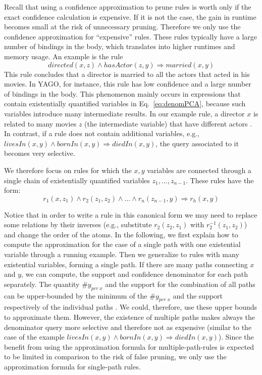 Recall that using a confidence approximation to prune rules is worth only if the exact confidence calculation is expensive. 
If it is not the case, the gain in runtime becomes small at the risk of unnecessary pruning.
Therefore we only use the confidence approximation for ``expensive'' rules. 
These rules typically have a large number of bindings in the body, which translates into 
higher runtimes and memory usage. An example is the rule 
\[
 directed(x,z) \wedge hasActor(z,y) \Rightarrow married(x,y)
\]
This rule concludes that a director is married to all the actors that acted in his movies. In YAGO, for instance,
this rule has low confidence and a large number of bindings in the body.
This phenomenon mainly occurs in expressions that contain existentially quantified variables in Eq.~\ref{eq:denomPCA}, 
because such variables introduce many intermediate results. In our example
rule, a director $x$ is related to many movies $z$ (the intermediate variable) that have different actors . 
In contrast, if a rule does not contain additional variables, 
e.g., $livesIn(x,y)\wedge bornIn(x,y)\Rightarrow diedIn(x,y)$, the query associated to it becomes very selective.

We therefore focus on rules for which the $x,y$ variables are connected through a single 
chain of existentially quantified variables $z_1,..., z_{n-1}$. These rules have the form:
$$
  r_1(x,z_1) \wedge r_2(z_1,z_2) \wedge ... \wedge r_n(z_{n-1},y) \Rightarrow r_h(x,y)
$$

Notice that in order to write a rule in this canonical form we may need to replace some relations by their inverses
(e.g., substitute $r_2(z_2,z_1)$ with $r_2^{-1}(z_1,z_2)$)
and change the order of the atoms.
In the following, we first explain how to compute the approximation for the case of a single 
path with one existential variable through a running example.
Then we generalize to rules with many existential variables, forming a single path. 
If there are many paths connecting $x$ and $y$, we can compute, the support and confidence denominator for each path separately.
The quantity $\#y_{per\;x}$ and the support for the combination of all paths can be upper-bounded by the minimum of the $\#y_{per\;x}$ and the support 
respectively of the individual paths . We could, therefore, use these upper bounds to approximate them.
However, the existence of multiple paths makes always the denominator query more selective and therefore not as expensive (similar to the case of the 
example $livesIn(x,y)\wedge bornIn(x,y)\Rightarrow diedIn(x,y)$). Since the benefit from using the approximation formula for multiple-path-rules
is expected to be limited in comparison to the risk of false pruning, we only use the approximation formula for single-path rules. 


